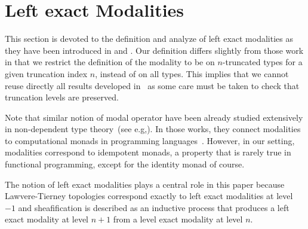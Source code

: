 \documentclass[preprint,9pt,numbers]{sigplanconf}
\newtheorem{thm}{Theorem}
\newcommand{\eg}{e.g,\xspace}
\begin{document}




\section{Left exact Modalities}
\label{sec:lexmod}

This section is devoted to the definition and analyze of left exact
modalities as they have been introduced in \cite{hottbook} and
\cite{shulman-higher-modalities}. Our definition differs slightly from
those work in that we restrict the definition of the modality to be on
$n$-truncated types for a given truncation index $n$, instead of on
all types.
%
This implies that we cannot reuse directly all results developed
in~\cite{hottbook} as some care must be taken to check that truncation
levels are preserved.

Note that similar notion of modal operator have been already studied
extensively in non-dependent type
theory~(see \eg \cite{benton1998computational}). In those works, they connect
modalities to computational monads in programming
languages~\cite{moggi-monad}. However, in our setting, modalities
correspond to idempotent monads, a property that is rarely true 
in functional programming, except for the identity monad of course.

The notion of left exact modalities plays a central role in this paper
because Lawvere-Tierney topologies correspond exactly to left exact
modalities at level $-1$ and sheafification is described as an inductive
process that produces a left exact modality at level $n+1$ from a
level exact modality at level $n$. 

\end{document}

